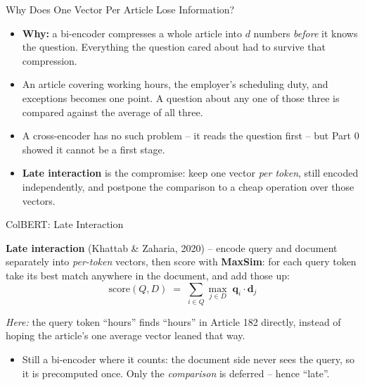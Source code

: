 \begin{frame}{Why Does One Vector Per Article Lose Information?}
\begin{itemize}
  \item \textbf{Why:} a bi-encoder compresses a whole article into $d$ numbers \emph{before} it knows the question. Everything the question cared about had to survive that compression.
  \pause
  \item An article covering working hours, the employer's scheduling duty, and exceptions becomes one point. A question about any one of those three is compared against the average of all three.
  \pause
  \item A cross-encoder has no such problem -- it reads the question first -- but Part 0 showed it cannot be a first stage.
  \pause
  \item \textbf{Late interaction} is the compromise: keep one vector \emph{per token}, still encoded independently, and postpone the comparison to a cheap operation over those vectors.
\end{itemize}
\end{frame}

\begin{frame}{ColBERT: Late Interaction}
\begin{rldefinition}
\textbf{Late interaction} (Khattab \& Zaharia, 2020) -- encode query and document separately into \emph{per-token} vectors, then score with \textbf{MaxSim}: for each query token take its best match anywhere in the document, and add those up:
\vspace{-0.3em}
\[
  \mathrm{score}(Q,D) \;=\; \sum_{i \in Q} \max_{j \in D} \; \mathbf{q}_i \cdot \mathbf{d}_j
\]
\vspace{-0.6em}

\emph{Here:} the query token ``hours'' finds ``hours'' in Article 182 directly, instead of hoping the article's one average vector leaned that way.
\end{rldefinition}
\pause
\begin{itemize}
  \item Still a bi-encoder where it counts: the document side never sees the query, so it is precomputed once. Only the \emph{comparison} is deferred -- hence ``late''.
\end{itemize}
\end{frame}

